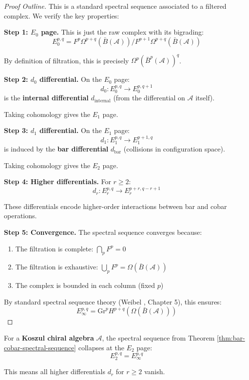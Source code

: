 \begin{proof}[Proof Outline]
This is a standard spectral sequence associated to a filtered complex. We verify 
the key properties:

\textbf{Step 1: $E_0$ page.} This is just the raw complex with its bigrading:
$$E_0^{p,q} = F^p\Omega^{p+q}(\bar{B}(\mathcal{A})) / F^{p+1}\Omega^{p+q}(\bar{B}(\mathcal{A}))$$

By definition of filtration, this is precisely $\Omega^p(\bar{B}^p(\mathcal{A}))^q$.

\textbf{Step 2: $d_0$ differential.} On the $E_0$ page:
$$d_0: E_0^{p,q} \to E_0^{p,q+1}$$
is the \textbf{internal differential} $d_{\text{internal}}$ (from the differential 
on $\mathcal{A}$ itself).

Taking cohomology gives the $E_1$ page.

\textbf{Step 3: $d_1$ differential.} On the $E_1$ page:
$$d_1: E_1^{p,q} \to E_1^{p+1,q}$$
is induced by the \textbf{bar differential} $d_{\text{bar}}$ (collisions in 
configuration space).

Taking cohomology gives the $E_2$ page.

\textbf{Step 4: Higher differentials.} For $r \geq 2$:
$$d_r: E_r^{p,q} \to E_r^{p+r,q-r+1}$$

These differentials encode higher-order interactions between bar and cobar operations.

\textbf{Step 5: Convergence.} The spectral sequence converges because:
\begin{enumerate}
\item The filtration is complete: $\bigcap_p F^p = 0$
\item The filtration is exhaustive: $\bigcup_p F^p = \Omega(\bar{B}(\mathcal{A}))$
\item The complex is bounded in each column (fixed $p$)
\end{enumerate}

By standard spectral sequence theory (Weibel \cite{Wei94}, Chapter 5), this ensures:
$$E_\infty^{p,q} = \text{Gr}^p H^{p+q}(\Omega(\bar{B}(\mathcal{A})))$$
\end{proof}

\begin{theorem}[Collapse at $E_2$]\label{thm:spectral-sequence-collapse}
For a \textbf{Koszul chiral algebra} $\mathcal{A}$, the spectral sequence from 
Theorem \ref{thm:bar-cobar-spectral-sequence} collapses at the $E_2$ page:
$$E_2^{p,q} = E_\infty^{p,q}$$

This means all higher differentials $d_r$ for $r \geq 2$ vanish.
\end{theorem}

